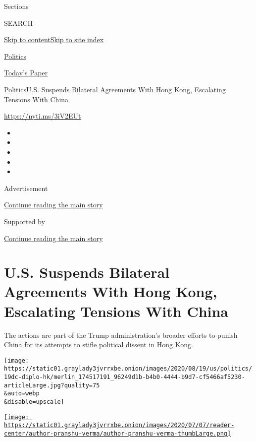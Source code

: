 Sections

SEARCH

\protect\hyperlink{site-content}{Skip to
content}\protect\hyperlink{site-index}{Skip to site index}

\href{https://www.nytimes3xbfgragh.onion/section/politics}{Politics}

\href{https://myaccount.nytimes3xbfgragh.onion/auth/login?response_type=cookie\&client_id=vi}{}

\href{https://www.nytimes3xbfgragh.onion/section/todayspaper}{Today's
Paper}

\href{/section/politics}{Politics}\textbar{}U.S. Suspends Bilateral
Agreements With Hong Kong, Escalating Tensions With China

\url{https://nyti.ms/3iV2EUt}

\begin{itemize}
\item
\item
\item
\item
\item
\end{itemize}

Advertisement

\protect\hyperlink{after-top}{Continue reading the main story}

Supported by

\protect\hyperlink{after-sponsor}{Continue reading the main story}

\hypertarget{us-suspends-bilateral-agreements-with-hong-kong-escalating-tensions-with-china}{%
\section{U.S. Suspends Bilateral Agreements With Hong Kong, Escalating
Tensions With
China}\label{us-suspends-bilateral-agreements-with-hong-kong-escalating-tensions-with-china}}

The actions are part of the Trump administration's broader efforts to
punish China for its attempts to stifle political dissent in Hong Kong.

\texttt{[image: https://static01.graylady3jvrrxbe.onion/images/2020/08/19/us/politics/19dc-diplo-hk/merlin\_174517191\_96249d1b-b4b0-4444-b9d7-cf5466af5230-articleLarge.jpg?quality=75\\\&auto=webp\\\&disable=upscale]}

\href{https://www.nytimes3xbfgragh.onion/by/pranshu-verma}{\texttt{[image: https://static01.graylady3jvrrxbe.onion/images/2020/07/07/reader-center/author-pranshu-verma/author-pranshu-verma-thumbLarge.png]}}

